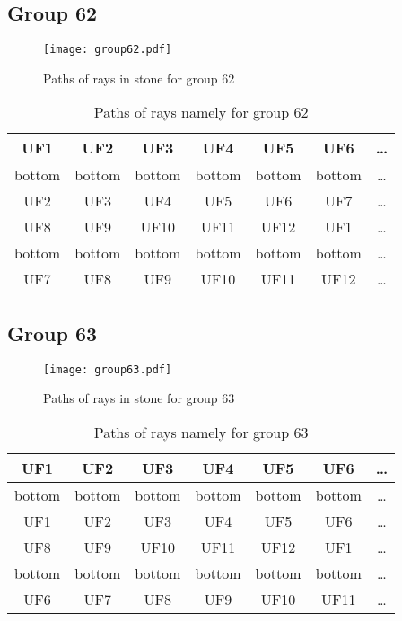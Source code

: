 \subsection*{Group 62}






\begin{figure}[h!]
\centering
\texttt{[image: group62.pdf]}
\caption{Paths of rays in stone for group 62}
\label{table:FigGroup62}
\end{figure}



\begin{table}[h!]
\centering
\begin{tabular}{|c|c|c|c|c|c|c|}
\hline
UF1 & UF2 & UF3 & UF4 & UF5 & UF6 & \dots \\
\hline
bottom & bottom & bottom & bottom & bottom & bottom & \dots \\
\hline
UF2 & UF3 & UF4 & UF5 & UF6 & UF7 & \dots \\
\hline
UF8 & UF9 & UF10 & UF11 & UF12 & UF1 & \dots \\
\hline
bottom & bottom & bottom & bottom & bottom & bottom & \dots \\
\hline
UF7 & UF8 & UF9 & UF10 & UF11 & UF12 & \dots \\
\hline
\end{tabular}
\caption{Paths of rays namely for group 62}
\label{table:TableGroup62}
\end{table}
\newpage
\subsection*{Group 63}






\begin{figure}[h!]
\centering
\texttt{[image: group63.pdf]}
\caption{Paths of rays in stone for group 63}
\label{table:FigGroup63}
\end{figure}



\begin{table}[h!]
\centering
\begin{tabular}{|c|c|c|c|c|c|c|}
\hline
UF1 & UF2 & UF3 & UF4 & UF5 & UF6 & \dots \\
\hline
bottom & bottom & bottom & bottom & bottom & bottom & \dots \\
\hline
UF1 & UF2 & UF3 & UF4 & UF5 & UF6 & \dots \\
\hline
UF8 & UF9 & UF10 & UF11 & UF12 & UF1 & \dots \\
\hline
bottom & bottom & bottom & bottom & bottom & bottom & \dots \\
\hline
UF6 & UF7 & UF8 & UF9 & UF10 & UF11 & \dots \\
\hline
\end{tabular}
\caption{Paths of rays namely for group 63}
\label{table:TableGroup63}
\end{table}
\newpage
